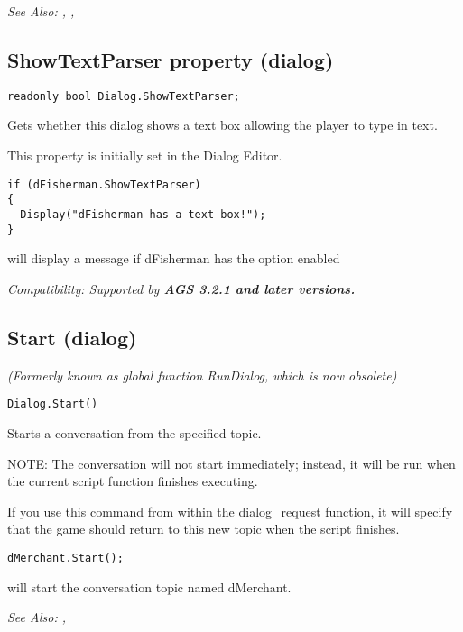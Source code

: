 \it{See Also:} ,
, 


\subsection{ShowTextParser property (dialog)}\label{Dialog.ShowTextParser}%

\begin{verbatim}
readonly bool Dialog.ShowTextParser;
\end{verbatim}
Gets whether this dialog shows a text box allowing the player to type in text.

This property is initially set in the Dialog Editor.

\begin{verbatim}
if (dFisherman.ShowTextParser)
{
  Display("dFisherman has a text box!");
}
\end{verbatim}
will display a message if dFisherman has the option enabled

\it{Compatibility:} Supported by \bf{AGS 3.2.1} and later versions.


\subsection{Start (dialog)}\label{Dialog.Start}%

\it{(Formerly known as global function RunDialog, which is now obsolete)}

\begin{verbatim}
Dialog.Start()
\end{verbatim}
Starts a conversation from the specified topic.

NOTE: The conversation will not start immediately; instead, it will be run
when the current script function finishes executing.

If you use this command from within the dialog_request function, it will
specify that the game should return to this new topic when the script finishes.

\begin{verbatim}
dMerchant.Start();
\end{verbatim}
will start the conversation topic named dMerchant.

\it{See Also:} ,


